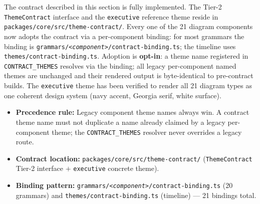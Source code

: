 The contract described in this section is fully implemented. The Tier-2
\texttt{ThemeContract} interface and the \texttt{executive} reference theme reside in
\texttt{packages/core/src/theme-contract/}. Every one of the 21 diagram components now
adopts the contract via a per-component binding: for most grammars the binding is
\texttt{grammars/\textit{<component>}/contract-binding.ts}; the timeline uses
\texttt{themes/contract-binding.ts}. Adoption is \textbf{opt-in}: a theme name registered
in \texttt{CONTRACT\_THEMES} resolves via the binding; all legacy per-component named themes
are unchanged and their rendered output is byte-identical to pre-contract builds. The
\texttt{executive} theme has been verified to render all 21 diagram types as one coherent
design system (navy accent, Georgia serif, white surface).

\begin{itemize}
  \item \textbf{Precedence rule:} Legacy component theme names always win. A contract
        theme name must not duplicate a name already claimed by a legacy per-component
        theme; the \texttt{CONTRACT\_THEMES} resolver never overrides a legacy route.
  \item \textbf{Contract location:}
        \texttt{packages/core/src/theme-contract/}
        (\texttt{ThemeContract} Tier-2 interface $+$ \texttt{executive} concrete theme).
  \item \textbf{Binding pattern:}
        \texttt{grammars/\textit{<component>}/contract-binding.ts} (20 grammars)
        and \texttt{themes/contract-binding.ts} (timeline) --- 21 bindings total.
\end{itemize}
